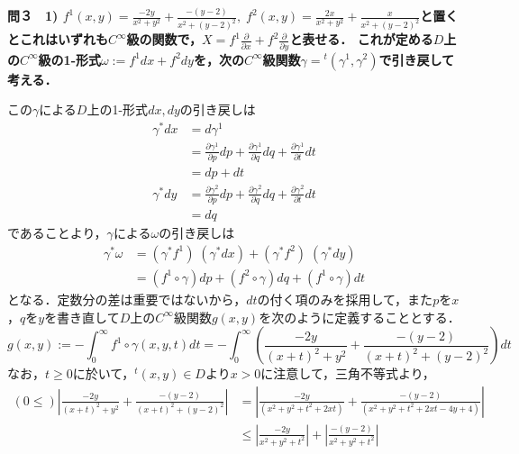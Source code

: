 \documentclass[dvipdfmx,a4paper,uplatex]{jsarticle}
\begin{document}
\bf{問３　1)} $f^1(x,y)=\frac{-2y}{x^2+y^2}+\frac{-(y-2)}{x^2+(y-2)^2},\; f^2(x,y)=\frac{2x}{x^2+y^2}+\frac{x}{x^2+(y-2)^2}$と置くとこれはいずれも$C^\infty$級の関数で，$X=f^1\frac{\partial}{\partial x}+f^2\frac{\partial}{\partial y}$と表せる．
これが定める$D$上の$C^\infty$級の1-形式$\omega:=f^1dx+f^2dy$を，次の$C^\infty$級関数$\gamma={}^t(\gamma^1,\gamma^2)$で引き戻して考える．
\begin{center}
\end{center}
この$\gamma$による$D$上の1-形式$dx,dy$の引き戻しは
\begin{align*}
    \gamma^*dx &= d\gamma^1 \\
    &= \frac{\partial\gamma^1}{\partial p}dp + \frac{\partial\gamma^1}{\partial q}dq + \frac{\partial\gamma^1}{\partial t}dt\\
    &= dp+dt\\
    \gamma^*dy &= \frac{\partial\gamma^2}{\partial p}dp + \frac{\partial\gamma^2}{\partial q}dq + \frac{\partial\gamma^2}{\partial t}dt\\
    &= dq
\end{align*}
であることより，$\gamma$による$\omega$の引き戻しは
\begin{align*}
    \gamma^*\omega &= (\gamma^*f^1)\;(\gamma^*dx) + (\gamma^*f^2)\;(\gamma^*dy) \\
    &= (f^1\circ\gamma) dp + (f^2\circ\gamma )dq + (f^1\circ\gamma) dt
\end{align*}
となる．定数分の差は重要ではないから，$dt$の付く項のみを採用して，また$p$を$x$，$q$を$y$を書き直して$D$上の$C^\infty$級関数$g(x,y)$を次のように定義することとする．
\[ g(x,y):=-\int^\infty_0f^1\circ\gamma(x,y,t) dt = -\int^\infty_0 \left( \frac{-2y}{(x+t)^2+y^2} + \frac{-(y-2)}{(x+t)^2+(y-2)^2} \right)dt \]
なお，$t\ge 0$に於いて，${}^t(x,y)\in D$より$x>0$に注意して，三角不等式より，
\begin{align*}
    (0\le)\left| \frac{-2y}{(x+t)^2+y^2} + \frac{-(y-2)}{(x+t)^2+(y-2)^2} \right| &= \left| \frac{-2y}{(x^2+y^2+t^2+2xt)} + \frac{-(y-2)}{(x^2+y^2+t^2+2xt-4y+4)} \right|\\
    &\le \left| \frac{-2y}{x^2+y^2+t^2} \right| + \left| \frac{-(y-2)}{x^2+y^2+t^2} \right|
\end{align*}
\end{document}
